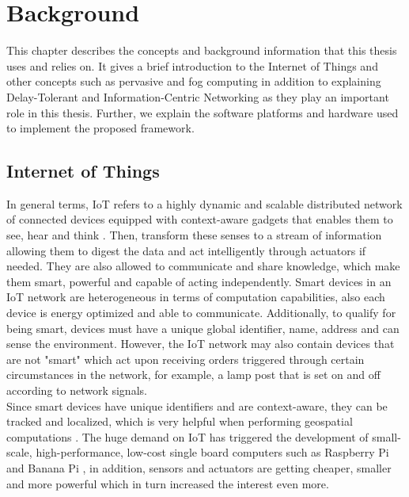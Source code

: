 
\chapter{Background}\label{chapter:background}

This chapter describes the concepts and background information that this thesis uses and relies on. It gives a brief introduction to the Internet of Things and other concepts such as pervasive and fog computing in addition to  explaining Delay-Tolerant and Information-Centric Networking as they play an important role in this thesis. Further, we explain the software platforms and hardware used to implement the proposed framework.

\section{Internet of Things}

In general terms, IoT refers to a highly dynamic and scalable distributed network of connected devices equipped with context-aware gadgets that enables them to see, hear and think \cite{DAC:DAC2417}. Then, transform these senses to a stream of information allowing them to digest the data and act intelligently through actuators if needed. They are also allowed to communicate and share knowledge, which make them smart, powerful and capable of acting independently. Smart devices in an IoT network are heterogeneous in terms of computation capabilities, also each device is energy optimized and able to communicate. Additionally, to qualify for being smart, devices must have a unique global identifier, name, address and can sense the environment. However, the IoT network may also contain devices that are not "smart" which act upon receiving orders triggered through certain circumstances in the network, for example, a lamp post that is set on and off according to network signals. \\

\noindent Since smart devices have unique identifiers and are context-aware, they can be tracked and localized, which is very helpful when performing geospatial computations \cite{Miorandi20121497}. The huge demand on IoT has triggered the development of small-scale, high-performance, low-cost single board computers such as Raspberry Pi \cite{RaspberryPi} and Banana Pi \cite{bananapi}, in addition, sensors and actuators are getting cheaper, smaller and more powerful which in turn increased the interest even more.\\
 

